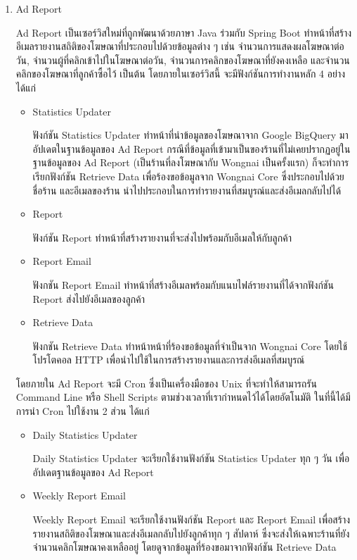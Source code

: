 \begin{enumerate}
	\item Ad Report
	
	Ad Report เป็นเซอร์วิสใหม่ที่ถูกพัฒนาด้วยภาษา Java ร่วมกับ Spring Boot ทำหน้าที่สร้างอีเมลรายงานสถิติของโฆษณาที่ประกอบไปด้วยข้อมูลต่าง ๆ เช่น จำนวนการแสดงผลโฆษณาต่อวัน, จำนวนผู้ที่คลิกเข้าไปในโฆษณาต่อวัน, จำนวนการคลิกของโฆษณาที่ยังคงเหลือ และจำนวนคลิกของโฆษณาที่ลูกค้าซื้อไว้ เป็นต้น โดยภายในเซอร์วิสนี้ จะมีฟังก์ชันการทำงานหลัก 4 อย่าง ได้แก่
	\begin{itemize}
		\item Statistics Updater
		
		ฟังก์ชัน Statistics Updater ทำหน้าที่นำข้อมูลของโฆษณาจาก Google BigQuery มาอัปเดตในฐานข้อมูลของ Ad Report กรณีที่ข้อมูลที่เข้ามาเป็นของร้านที่ไม่เคยปรากฏอยู่ในฐานข้อมูลของ Ad Report (เป็นร้านที่ลงโฆษณากับ Wongnai เป็นครั้งแรก) ก็จะทำการเรียกฟังก์ชัน Retrieve Data เพื่อร้องขอข้อมูลจาก Wongnai Core ซึ่งประกอบไปด้วยชื่อร้าน และอีเมลของร้าน นำไปประกอบในการทำรายงานที่สมบูรณ์และส่งอีเมลกลับไปได้
		\item Report
		
		ฟังก์ชัน Report ทำหน้าที่สร้างรายงานที่จะส่งไปพร้อมกับอีเมลให้กับลูกค้า
		\item Report Email
		
		ฟังกชัน Report Email ทำหน้าที่สร้างอีเมลพร้อมกับแนบไฟล์รายงานที่ได้จากฟังก์ชัน Report ส่งไปยังอีเมลของลูกค้า
		\item Retrieve Data
		
		ฟังกชัน Retrieve Data ทำหน้าหน้าที่ร้องขอข้อมูลที่จำเป็นจาก Wongnai Core โดยใช้โปรโตคอล HTTP เพื่อนำไปใช้ในการสร้างรายงานและการส่งอีเมลที่สมบูรณ์
	\end{itemize}
	โดยภายใน Ad Report จะมี Cron ซึ่งเป็นเครื่องมือของ Unix ที่จะทำให้สามารถรัน Command Line หรือ Shell Scripts ตามช่วงเวลาที่เรากำหนดไว้ได้โดยอัตโนมัติ ในที่นี้ได้มีการนำ Cron ไปใช้งาน 2 ส่วน ได้แก่
	\begin{itemize}
		\item Daily Statistics Updater
		
		Daily Statistics Updater จะเรียกใช้งานฟังก์ชัน Statistics Updater ทุก ๆ วัน เพื่ออัปเดตฐานข้อมูลของ Ad Report
		\item Weekly Report Email
		
		Weekly Report Email จะเรียกใช้งานฟังก์ชัน Report และ Report Email เพื่อสร้างรายงานสถิติของโฆษณาและส่งอีเมลกลับไปยังลูกค้าทุก ๆ สัปดาห์ ซึ่งจะส่งให้เฉพาะร้านที่ยังจำนวนคลิกโฆษณาคงเหลืออยู่ โดยดูจากข้อมูลที่ร้องขอมาจากฟังก์ชัน Retrieve Data
	\end{itemize}
\end{enumerate}

